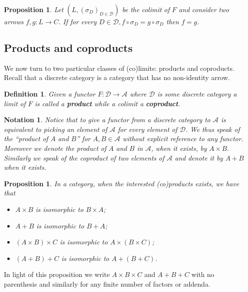 \documentclass[letterpaper, 11pt, oneside]{memoir}
\theoremstyle{myteo}
\newtheorem{proposition}[theorem]{Proposition}
\newtheorem{definition}[theorem]{Definition}
\newtheorem{notation}[theorem]{Notation}
\numberwithin{equation}{section}
\newcommand{\marginnote}[1]{\marginpar{\footnotesize #1}}
\newcommand{\A}{\mathscr{A}}
\begin{document}
\begin{proposition}
  \label{prop:arrows_from_colimit}
  Let \((L, (\sigma_D)_{D \in \mathscr{D}})\) be the colimit of \(F\) and consider two arrows \(f,g \colon L \to C\).
  If for every \(D \in \mathscr{D}, f \circ \sigma_D =  g \circ \sigma_D\) then \(f = g\).
\end{proposition}

\subsection{Products and coproducts}

We now turn to two particular classes of (co)limits: products and coproducts.
Recall that a discrete category is a category that has no non-identity arrow.

\begin{definition}
  Given a functor \(F \colon \mathscr{D} \to \A\) where \(\mathscr{D}\) is some discrete category a limit of \(F\) is called a \textbf{product} while a colimit a \textbf{coproduct}.
  \marginnote{product, coproduct}
\end{definition}

\begin{notation}
  Notice that to give a functor from a discrete category to \(\A\) is equivalent to picking an element of \(\A\) for every element of \(\mathscr{D}\).
  We thus speak of the ``product of \(A\) and \(B\)'' for \(A, B \in \A\) without explicit reference to any functor.
  Moreover we denote the product of \(A\) and \(B\) in \(\A\), when it exists, by \(A \times B\).
  Similarly we speak of the coproduct of two elements of \(\A\) and denote it by \(A + B\) when it exists.
\end{notation}

\begin{proposition}
  In a category, when the interested (co)products exists, we have that
  \begin{itemize}
  \item[1.] \(A \times B\) is isomorphic to \(B \times A\);
  \item[2.] \(A + B\) is isomorphic to \(B + A\);
  \item[3.] \((A \times B) \times C\) is isomorphic to \(A \times (B \times C)\);
  \item[4.] \((A + B) + C\) is isomorphic to \(A + (B + C)\).
  \end{itemize}
\end{proposition}

In light of this proposition we write \(A \times B \times C\) and \(A + B + C\) with no parenthesis and similarly for any finite number of factors or addenda.
\end{document}

